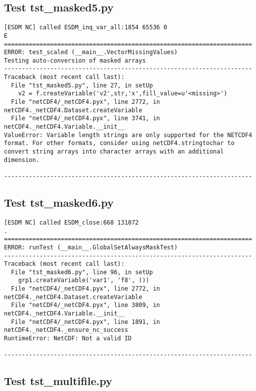 \subsection{Test tst\_masked5.py}

\begin{verbatim}
[ESDM NC] called ESDM_inq_var_all:1854 65536 0
E
======================================================================
ERROR: test_scaled (__main__.VectorMissingValues)
Testing auto-conversion of masked arrays
----------------------------------------------------------------------
Traceback (most recent call last):
  File "tst_masked5.py", line 27, in setUp
    v2 = f.createVariable('v2',str,'x',fill_value=u'<missing>')
  File "netCDF4/_netCDF4.pyx", line 2772, in netCDF4._netCDF4.Dataset.createVariable
  File "netCDF4/_netCDF4.pyx", line 3741, in netCDF4._netCDF4.Variable.__init__
ValueError: Variable length strings are only supported for the NETCDF4 format. For other formats, consider using netCDF4.stringtochar to convert string arrays into character arrays with an additional dimension.

----------------------------------------------------------------------
\end{verbatim}

\subsection{Test tst\_masked6.py}

\begin{verbatim}
[ESDM NC] called ESDM_close:668 131072
.
======================================================================
ERROR: runTest (__main__.GlobalSetAlwaysMaskTest)
----------------------------------------------------------------------
Traceback (most recent call last):
  File "tst_masked6.py", line 96, in setUp
    grp1.createVariable('var1', 'f8', ())
  File "netCDF4/_netCDF4.pyx", line 2772, in netCDF4._netCDF4.Dataset.createVariable
  File "netCDF4/_netCDF4.pyx", line 3809, in netCDF4._netCDF4.Variable.__init__
  File "netCDF4/_netCDF4.pyx", line 1891, in netCDF4._netCDF4._ensure_nc_success
RuntimeError: NetCDF: Not a valid ID

----------------------------------------------------------------------
\end{verbatim}

\subsection{Test tst\_multifile.py}

